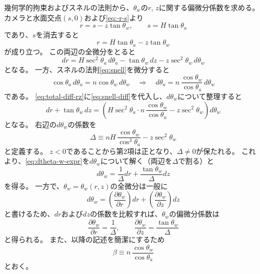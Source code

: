 幾何学的拘束およびスネルの法則から、$\theta_w$の$r$, $z$に関する偏微分係数を求める。
カメラと水面交点$(s, 0)$および\cref{eq:-r-s}より
\begin{equation}\label{eq:geom-constraint}
  r = s - z \tan \theta_w, \qquad s = H \tan \theta_a
\end{equation}
であり、$s$を消去すると
\begin{equation}\label{eq:constraint-rz}
  r = H \tan \theta_a - z \tan \theta_w
\end{equation}
が成り立つ。
この両辺の全微分をとると
\begin{equation}\label{eq:total-diff-rz}
  dr = H \sec^2 \theta_a \, d\theta_a - \tan \theta_w \, dz - z \sec^2 \theta_w \, d\theta_w
\end{equation}
となる。
一方、スネルの法則\cref{eq:snell}を微分すると
\begin{equation}\label{eq:snell-diff}
  \cos \theta_a \, d\theta_a = n \cos \theta_w \, d\theta_w \quad \Rightarrow \quad d\theta_a = n \, \frac{\cos \theta_w}{\cos \theta_a} \, d\theta_w
\end{equation}
である。
\eqref{eq:total-diff-rz}に\eqref{eq:snell-diff}を代入し、$d\theta_w$について整理すると
\begin{equation}\label{eq:dtheta-w-expr}
  dr + \tan \theta_w \, dz = \left( H \sec^2 \theta_a \cdot n \, \frac{\cos \theta_w}{\cos \theta_a} - z \sec^2 \theta_w \right) d\theta_w
\end{equation}
となる。
右辺の$d\theta_w$の係数を
\begin{equation}\label{eq:Delta-def}
  \Delta \equiv n H \, \frac{\cos \theta_w}{\cos^3 \theta_a} - z \sec^2 \theta_w
\end{equation}
と定義する。
$z < 0$であることから第2項は正となり、$\Delta \neq 0$が保たれる。
これより、\eqref{eq:dtheta-w-expr}を$d\theta_w$について解く（両辺を$\Delta$で割る）と
\begin{equation}\label{eq:dtheta-w-solved}
  d\theta_w = \frac{1}{\Delta}dr + \frac{\tan\theta_w}{\Delta}dz
\end{equation}
を得る。
一方で、$\theta_w=\theta_w(r,z)$の全微分は一般に
\begin{equation}
  d\theta_w = \left(\frac{\partial \theta_w}{\partial r}\right)dr + \left(\frac{\partial \theta_w}{\partial z}\right)dz
\end{equation}
と書けるため、$dr$および$dz$の係数を比較すれば、$\theta_w$の偏微分係数は
\begin{equation}\label{eq:partial-theta-w}
  \frac{\partial \theta_w}{\partial r} = \frac{1}{\Delta}, \qquad \frac{\partial \theta_w}{\partial z} = \frac{\tan \theta_w}{\Delta}
\end{equation}
と得られる。
また、以降の記述を簡潔にするため
\begin{equation}\label{eq:alpha-def}
  \beta \equiv n \, \frac{\cos \theta_w}{\cos \theta_a}
\end{equation}
とおく。

